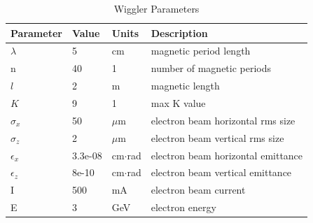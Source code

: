 \documentclass{iucr}
\begin{document}
\begin{table}\label{ivwbalder}
\caption{Wiggler Parameters}
\begin{tabular}{@{}llll@{}}
Parameter       & Value         & Units     & Description                           \\
\hline
$\lambda$       & 5             & cm        & magnetic period length                \\
n               & 40            & 1         & number of magnetic periods            \\ 
$l$             & 2             & m         & magnetic length                       \\
$K$             & 9             & 1         & max K value                           \\
$\sigma_x$      & 50            & $\mu$m    & electron beam horizontal rms size     \\
$\sigma_z$      & 2             & $\mu$m    & electron beam vertical rms size       \\
$\epsilon_x$    & 3.3e-08       & cm$\cdot$rad    & electron beam horizontal emittance    \\
$\epsilon_z$    & 8e-10         & cm$\cdot$rad    & electron beam vertical emittance      \\
I               & 500           & mA        & electron beam current                 \\
E               & 3             & GeV       & electron energy                       \\
\end{tabular}
\end{table}
\end{document}
